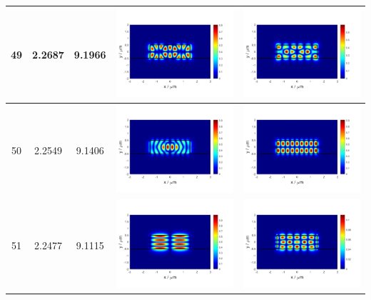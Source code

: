 \documentclass{assignment}
\begin{document}
\begin{sol}
\begin{itemize}
\begin{longtable}[c]{|c|c|c|c|c|}
            49 & 2.2687 & 9.1966 & \includegraphics[width=.3\columnwidth]{Assignment-2-mode-49-Ex.png} & \includegraphics[width=.3\columnwidth]{Assignment-2-mode-49-Ey.png} \\ \hline
            50 & 2.2549 & 9.1406 & \includegraphics[width=.3\columnwidth]{Assignment-2-mode-50-Ex.png} & \includegraphics[width=.3\columnwidth]{Assignment-2-mode-50-Ey.png} \\ \hline
            51 & 2.2477 & 9.1115 & \includegraphics[width=.3\columnwidth]{Assignment-2-mode-51-Ex.png} & \includegraphics[width=.3\columnwidth]{Assignment-2-mode-51-Ey.png} \\ \hline

\end{longtable}
\end{itemize}
\end{sol}
\end{document}
